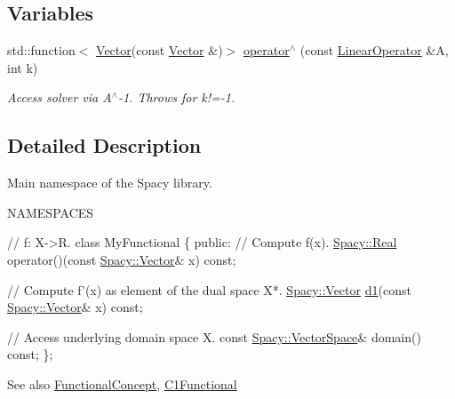 \subsection*{Variables}
\begin{DoxyCompactItemize}
\item 
\hypertarget{namespaceSpacy_a39b7357abb0410ba6e6c640029425400}{}std\+::function$<$ \hyperlink{classSpacy_1_1Vector}{Vector}(const \hyperlink{classSpacy_1_1Vector}{Vector} \&)$>$ \hyperlink{namespaceSpacy_a39b7357abb0410ba6e6c640029425400}{operator$^\wedge$} (const \hyperlink{classSpacy_1_1LinearOperator}{Linear\+Operator} \&A, int k)\label{namespaceSpacy_a39b7357abb0410ba6e6c640029425400}

\begin{DoxyCompactList}\small\item\em Access solver via A$^\wedge$-\/1. Throws for k!=-\/1. \end{DoxyCompactList}\end{DoxyCompactItemize}


\subsection{Detailed Description}
Main namespace of the Spacy library. 

N\+A\+M\+E\+S\+P\+A\+C\+E\+S

\label{namespaceSpacy_C1FunctionalConceptAnchor}%
\hypertarget{namespaceSpacy_C1FunctionalConceptAnchor}{}%
 
\begin{DoxyCode}
\textcolor{comment}{// f: X->R.}
\textcolor{keyword}{class }MyFunctional
\{
\textcolor{keyword}{public}:
  \textcolor{comment}{// Compute f(x).}
  \hyperlink{classSpacy_1_1Real}{Spacy::Real} operator()(\textcolor{keyword}{const} \hyperlink{classSpacy_1_1Vector}{Spacy::Vector}& x) \textcolor{keyword}{const};

  \textcolor{comment}{// Compute f'(x) as element of the dual space X*.}
  \hyperlink{classSpacy_1_1Vector}{Spacy::Vector} \hyperlink{namespaceSpacy_ab6646eb7068eb9f1369e639cf0b620a2}{d1}(\textcolor{keyword}{const} \hyperlink{classSpacy_1_1Vector}{Spacy::Vector}& x) \textcolor{keyword}{const};

  \textcolor{comment}{// Access underlying domain space X.}
  \textcolor{keyword}{const} \hyperlink{classSpacy_1_1VectorSpace}{Spacy::VectorSpace}& domain() \textcolor{keyword}{const};
\};
\end{DoxyCode}


\begin{DoxySeeAlso}{See also}
\hyperlink{group__ConceptGroup_gae45328d2e01ef6c8e5d948b69fda385f}{Functional\+Concept}, \hyperlink{classSpacy_1_1C1Functional}{C1\+Functional} 
\end{DoxySeeAlso}


